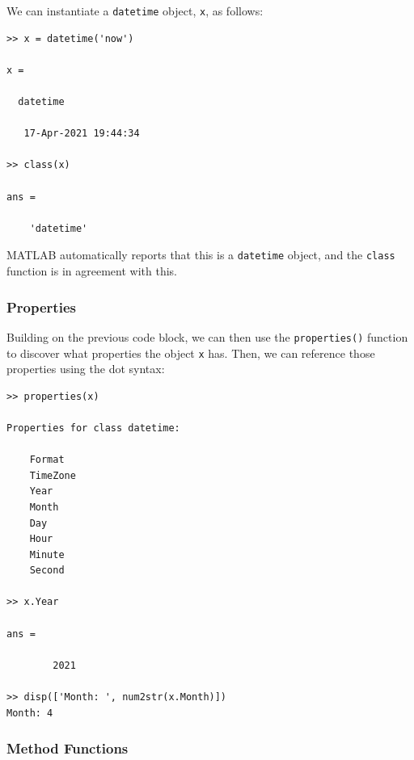 We can instantiate a \texttt{datetime} object, \texttt{x}, as follows:
\begin{lstlisting}[style=Matlab-editor, caption={This input to the MATLAB Command Window input uses the \texttt{datetime()} constructor method to instantiate a \texttt{datetime} object, \texttt{x}.}]
>> x = datetime('now')

x = 

  datetime

   17-Apr-2021 19:44:34

>> class(x)

ans =

    'datetime'
\end{lstlisting}
MATLAB automatically reports that this is a \texttt{datetime} object, and the \texttt{class} function is in agreement with this.

\subsubsection{Properties}
Building on the previous code block, we can then use the \texttt{properties()} function to discover what properties the object \texttt{x} has. Then, we can reference those properties using the dot syntax:
\begin{lstlisting}[style=Matlab-editor, caption={The \texttt{properties()} function lists the accessible properties of the \texttt{x} object.}]
>> properties(x)

Properties for class datetime:

    Format
    TimeZone
    Year
    Month
    Day
    Hour
    Minute
    Second
    
>> x.Year

ans =

        2021

>> disp(['Month: ', num2str(x.Month)])
Month: 4
\end{lstlisting}


\subsubsection{Method Functions}

